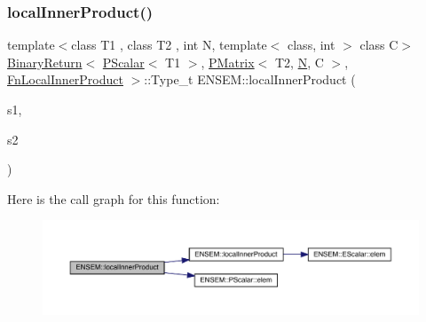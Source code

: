 \subsubsection{\texorpdfstring{localInnerProduct()}{localInnerProduct()}\hspace{0.1cm}{\footnotesize\ttfamily [3/3]}}
{\footnotesize\ttfamily template$<$class T1 , class T2 , int N, template$<$ class, int $>$ class C$>$ \\
\mbox{\hyperlink{structENSEM_1_1BinaryReturn}{Binary\+Return}}$<$ \mbox{\hyperlink{classENSEM_1_1PScalar}{P\+Scalar}}$<$ T1 $>$, \mbox{\hyperlink{classENSEM_1_1PMatrix}{P\+Matrix}}$<$ T2, \mbox{\hyperlink{adat__devel_2lib_2hadron_2operator__name__util_8cc_a7722c8ecbb62d99aee7ce68b1752f337}{N}}, C $>$, \mbox{\hyperlink{structENSEM_1_1FnLocalInnerProduct}{Fn\+Local\+Inner\+Product}} $>$\+::Type\+\_\+t E\+N\+S\+E\+M\+::local\+Inner\+Product (\begin{DoxyParamCaption}\item[{const \mbox{\hyperlink{classENSEM_1_1PScalar}{P\+Scalar}}$<$ T1 $>$ \&}]{s1,  }\item[{const \mbox{\hyperlink{classENSEM_1_1PMatrix}{P\+Matrix}}$<$ T2, \mbox{\hyperlink{adat__devel_2lib_2hadron_2operator__name__util_8cc_a7722c8ecbb62d99aee7ce68b1752f337}{N}}, C $>$ \&}]{s2 }\end{DoxyParamCaption})\hspace{0.3cm}{\ttfamily [inline]}}

Here is the call graph for this function\+:\nopagebreak
\begin{figure}[H]
\begin{center}
\leavevmode
\includegraphics[width=350pt]{df/d0a/group__primmatrix_gaaa8729c59af4a03489be7e620e3dd187_cgraph}
\end{center}
\end{figure}
\mbox{\label{group__primmatrix_ga512767c96aa10eafdf3b60be8dd2e9bb}} 
